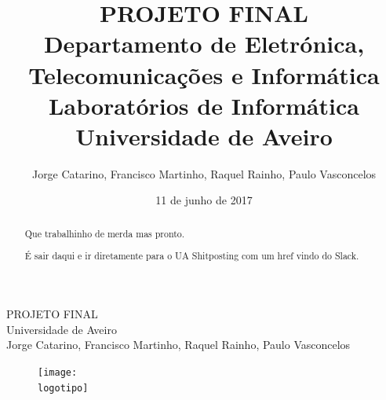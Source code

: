 \documentclass{report}
\begin{document}
%
\def\titulo{PROJETO FINAL}
\def\disciplina{Laboratórios de Informática}
\def\data{11 de junho de 2017}
\def\autores{Jorge Catarino, Francisco Martinho, Raquel Rainho, Paulo Vasconcelos}
\def\autorescontactos{(85028) jorge.catarino@ua.pt, (85088) martinho.francisco@ua.pt, (84891) raquel.a.rainho@ua.pt, (84987) paulobvasconcelos@ua.pt}
\def\versao{VERSAO}
\def\departamento{Departamento de Eletrónica, Telecomunicações e Informática}
\def\empresa{Universidade de Aveiro}
\def\logotipo{ua.pdf}
%
%
\begin{titlepage}

\begin{center}
%
\vspace*{50mm}
%
{\Huge \titulo}\\ 
%
\vspace{10mm}
%
{\Large \empresa}\\
%
\vspace{10mm}
%
{\LARGE \autores}\\ 
%
\vspace{30mm}
%
\begin{figure}[h]
\center
\texttt{[image: \\logotipo]}
\end{figure}
%
\vspace{30mm}
\end{center}
%
\end{titlepage}

\title{%
{\Huge\textbf{\titulo}}\\
{\large {\departamento \\
        \disciplina \\
        \empresa}}
}
%
\author{%
    \autores \\
}
%
\date{\data}
%
\maketitle


\begin{abstract}
Que trabalhinho de merda mas pronto.

É sair daqui e ir diretamente para o UA Shitposting com um href vindo do Slack.
\end{abstract}

\end{document}
